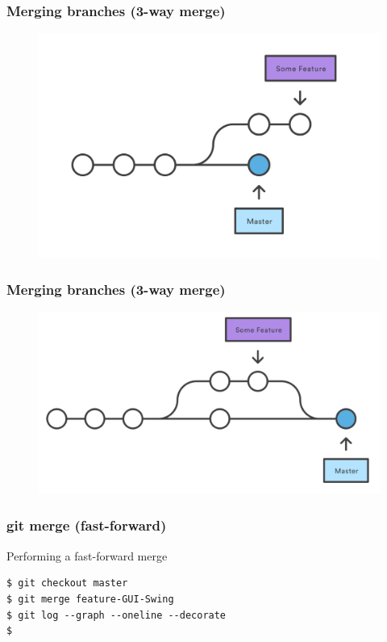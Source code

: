 \documentclass{beamer}
\begin{document}
\begin{frame}
\frametitle{Merging branches (3-way merge)}

\begin{figure}
\includegraphics[scale=0.8]{figures/f15.png}\hspace{1.5cm}
\end{figure}

\end{frame}

\begin{frame}
\frametitle{Merging branches (3-way merge)}

\begin{figure}
\includegraphics[scale=0.8]{figures/f16.png}
\end{figure}

\end{frame}

\begin{frame}[fragile]
\frametitle{git merge (fast-forward)}

Performing a fast-forward merge

\begin{lstlisting}
$ git checkout master
$ git merge feature-GUI-Swing
$ git log --graph --oneline --decorate
$ 
\end{lstlisting}
\end{frame}
\end{document}
